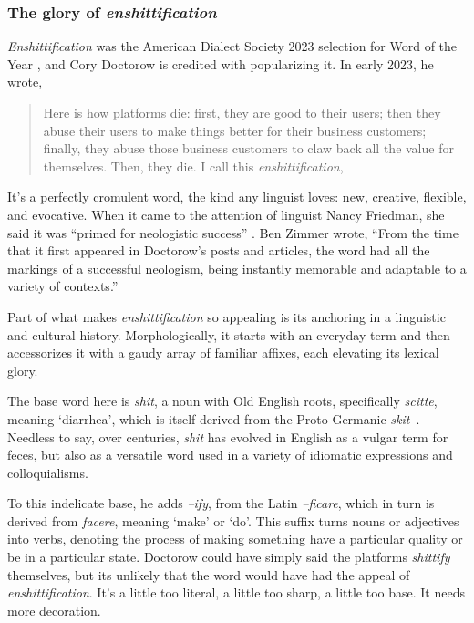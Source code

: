 \subsubsection{The glory of \textit{enshittification}}

\textit{Enshittification} was the American Dialect Society 2023 selection for Word of the Year \citep{Roberts2024}, and Cory Doctorow is credited with popularizing it. In early 2023, he wrote,


\begin{quote}
    Here is how platforms die: first, they are good to their users; then they abuse their users to make things better for their business customers; finally, they abuse those business customers to claw back all the value for themselves. Then, they die. I call this \textit{enshittification},\hfill\citep{doctorow2023}
\end{quote}

It's a perfectly cromulent word, the kind any linguist loves: new, creative, flexible, and evocative. When it came to the attention of linguist Nancy Friedman, she said it was ``primed for neologistic success'' \citep{friedman2024sweary}. Ben Zimmer wrote, ``From the time that it first appeared in Doctorow's posts and articles, the word had all the markings of a successful neologism, being instantly memorable and adaptable to a variety of contexts.''

Part of what makes \textit{enshittification} so appealing is its anchoring in a linguistic and cultural history. Morphologically, it starts with an everyday term and then accessorizes it with a gaudy array of familiar affixes, each elevating its lexical glory.

The base word here is \textit{shit}, a noun with Old English roots, specifically \textit{scitte}, meaning `diarrhea', which is itself derived from the Proto-Germanic \textit{skit--}. Needless to say, over centuries, \textit{shit} has evolved in English as a vulgar term for feces, but also as a versatile word used in a variety of idiomatic expressions and colloquialisms.

To this indelicate base, he adds \textit{--ify}, from the Latin \textit{--ficare}, which in turn is derived from \textit{facere}, meaning `make' or `do'. This suffix turns nouns or adjectives into verbs, denoting the process of making something have a particular quality or be in a particular state. Doctorow could have simply said the platforms \textit{shittify} themselves, but its unlikely that the word would have had the appeal of \textit{enshittification}. It's a little too literal, a little too sharp, a little too base. It needs more decoration.

